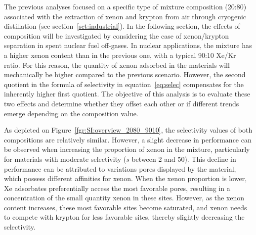 \documentclass[main.tex]{subfiles}
\begin{document}
The previous analyses focused on a specific type of mixture composition (20:80) associated with the extraction of xenon and krypton from air through cryogenic distillation (see section~\ref{sct:industrial}). In the following section, the effects of composition will be investigated by considering the case of xenon/krypton separation in spent nuclear fuel off-gases. In nuclear applications, the mixture has a higher xenon content than in the previous one, with a typical 90:10 Xe/Kr ratio. For this reason, the quantity of xenon adsorbed in the materials will mechanically be higher compared to the previous scenario. However, the second quotient in the formula of selectivity in equation~\ref{eq:selec} compensates for the inherently higher first quotient. The objective of this analysis is to evaluate these two effects and determine whether they offset each other or if different trends emerge depending on the composition value. 

As depicted on Figure~\ref{fgr:SI:overview_2080_9010}, the selectivity values of both compositions are relatively similar. However, a slight decrease in performance can be observed when increasing the proportion of xenon in the mixture, particularly for materials with moderate selectivity ($s$ between $2$ and $50$). This decline in performance can be attributed to variations pores displayed by the material, which possess different affinities for xenon. When the xenon proportion is lower, Xe adsorbates preferentially access the most favorable pores, resulting in a concentration of the small quantity xenon in these sites. However, as the xenon content increases, these most favorable sites become saturated, and xenon needs to compete with krypton for less favorable sites, thereby slightly decreasing the selectivity.
\end{document}
